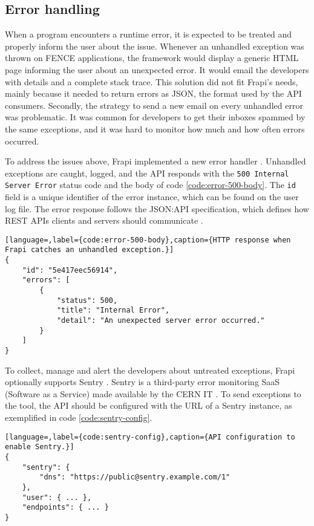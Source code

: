 \subsection{Error handling}
\label{sec:error-handling}

When a program encounters a runtime error, it is expected to be treated and properly inform the user about the issue. Whenever an unhandled exception was thrown on FENCE applications, the framework would display a generic HTML page informing the user about an unexpected error. It would email the developers with details and a complete stack trace. This solution did not fit Frapi's needs, mainly because it needed to return errors as JSON, the format used by the API consumers. Secondly, the strategy to send a new email on every unhandled error was problematic. It was common for developers to get their inboxes spammed by the same exceptions, and it was hard to monitor how much and how often errors occurred.

To address the issues above, Frapi implemented a new error handler \cite{frapi-error-handler-doc}. Unhandled exceptions are caught, logged, and the API responds with the \texttt{500 Internal Server Error} status code and the body of code \autoref{code:error-500-body}. The \texttt{id} field is a unique identifier of the error instance, which can be found on the user log file. The error response follows the JSON:API specification, which defines how REST APIs clients and servers should communicate \cite{json-api-intro} \cite{json-api-error} \cite{json-api-error-example}.

\begin{lstlisting}[language=,label={code:error-500-body},caption={HTTP response when Frapi catches an unhandled exception.}]
{
    "id": "5e417eec56914",
    "errors": [
        {
            "status": 500,
            "title": "Internal Error",
            "detail": "An unexpected server error occurred."
        }
    ]
}
\end{lstlisting}


To collect, manage and alert the developers about untreated exceptions, Frapi optionally supports Sentry \cite{sentry-about}. Sentry is a third-party error monitoring SaaS (Software as a Service) made available by the CERN IT \cite{sentry-cern}. To send exceptions to the tool, the API should be configured with the URL of a Sentry instance, as exemplified in code \autoref{code:sentry-config}.

\begin{lstlisting}[language=,label={code:sentry-config},caption={API configuration to enable Sentry.}]
{
    "sentry": {
        "dns": "https://public@sentry.example.com/1"
    },
    "user": { ... },
    "endpoints": { ... }
}
\end{lstlisting}

